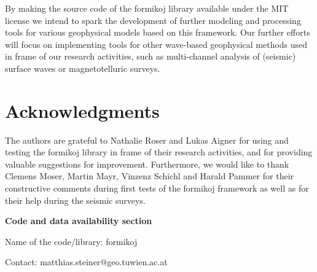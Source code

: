 \documentclass[a4paper,fleqn]{cas-sc}
\begin{document}

By making the source code of the formikoj library available under the MIT license we intend to spark the development of further modeling and processing tools for various geophysical models based on this framework. Our further efforts will focus on implementing tools for other wave-based geophysical methods used in frame of our research activities, such as multi-channel analysis of (seismic) surface waves or magnetotelluric surveys. 

\section{Acknowledgments}

The authors are grateful to Nathalie Roser and Lukas Aigner for using and testing the formikoj library in frame of their research activities, and for providing valuable suggestions for improvement. Furthermore, we would like to thank Clemens Moser, Martin Mayr, Vinzenz Schichl and Harald Pammer for their constructive comments during first tests of the formikoj framework as well as for their help during the seismic surveys.

\newpage

\textbf{Code and data availability section}

Name of the code/library: formikoj

Contact: matthias.steiner@geo.tuwien.ac.at
\end{document}
